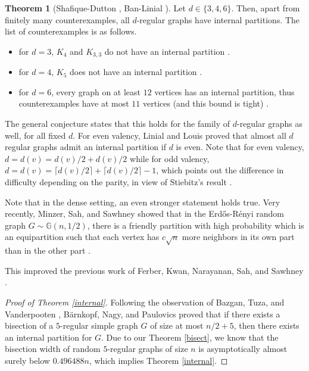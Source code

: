 \documentclass{article}
\theoremstyle{definition}
\newtheorem{theorem}[definition]{Theorem}
\begin{document}
\begin{theorem}[Shafique-Dutton \cite{shafique2002satisfactory}, Ban-Linial \cite{ban2016internal}]\label{kisr} Let $d\in \{3,4,6\}$. Then, apart from finitely many counterexamples, all $d$-regular graphs have internal partitions. The list of counterexamples is as follows.
\begin{itemize}
  \item for $d=3$, $K_4$ and $K_{3,3}$ do not have an internal partition \cite{shafique2002satisfactory}.
  \item for $d=4$, $K_5$  does not have an internal partition \cite{shafique2002satisfactory}.
  \item for $d=6$, every graph on at least $12$ vertices has an internal partition, thus counterexamples have at most $11$ vertices (and this bound is tight) \cite{ban2016internal}.
\end{itemize}
\end{theorem}
The general conjecture states that this holds for
the family of \(d\)-regular graphs as well, for all fixed \(d\).
For even valency, Linial and Louis proved \cite{linial2020asymptotically} that almost all $d$ regular graphs admit an internal partition if $d$ is even. Note that for even valency, $d=d(v)=d(v)/2+d(v)/2$ while for odd valency, $d=d(v)=\lceil d(v)/2\rceil +\lceil d(v)/2\rceil -1$, which points out the difference in difficulty depending on the parity, in view of Stiebitz's result \cite{stiebitz1996decomposing}.

Note that in the dense setting, an even stronger statement holds true. Very recently, Minzer, Sah, and Sawhney showed that in the Erdős-Rényi random graph $G\sim \mathbb{G}(n,1/2)$, there is a friendly partition with high probability which is an equipartition such that each vertex has $c\sqrt{n}$ more neighbors in its own part than in the other part \cite{minzer2024perfectly}.

This improved the previous work of Ferber, Kwan, Narayanan, Sah, and Sawhney \cite{ferber2022friendly}.

\begin{proof}[Proof of Theorem \ref{internal}]
Following the observation of Bazgan, Tuza, and Vanderpooten \cite{bazgan2010satisfactory},  Bärnkopf, Nagy, and Paulovics \cite{barnkopf2024note} proved that if there exists a bisection of a \(5\)-regular simple
graph $G$ of size at most \(n/2 + 5\), then there exists an internal partition for \(G\). 
Due to our Theorem \ref{bisect}, we know that the bisection width of random \(5\)-regular graphs of size \(n\) is asymptotically almost surely below \(0.496488n\), which implies Theorem \ref{internal}.
\end{proof}
\end{document}
